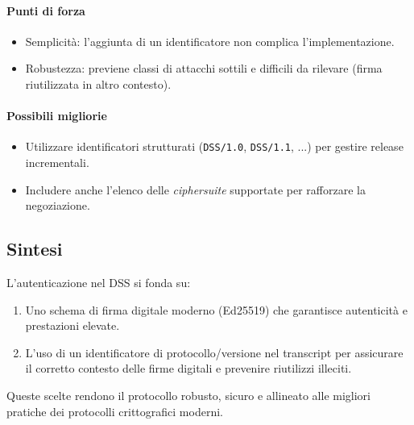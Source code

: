 \paragraph{Punti di forza}
\begin{itemize}
  \item Semplicità: l'aggiunta di un identificatore non complica l'implementazione.
  \item Robustezza: previene classi di attacchi sottili e difficili da rilevare (firma riutilizzata in altro contesto).
\end{itemize}

\paragraph{Possibili migliorie}
\begin{itemize}
  \item Utilizzare identificatori strutturati (\texttt{DSS/1.0}, \texttt{DSS/1.1}, ...) per gestire release incrementali.
  \item Includere anche l'elenco delle \emph{ciphersuite} supportate per rafforzare la negoziazione.
\end{itemize}

\subsection{Sintesi}
L'autenticazione nel DSS si fonda su:
\begin{enumerate}
  \item Uno schema di firma digitale moderno (Ed25519) che garantisce autenticità e prestazioni elevate.
  \item L'uso di un identificatore di protocollo/versione nel transcript per assicurare il corretto 
        contesto delle firme digitali e prevenire riutilizzi illeciti.
\end{enumerate}
Queste scelte rendono il protocollo robusto, sicuro e allineato alle migliori pratiche 
dei protocolli crittografici moderni.
